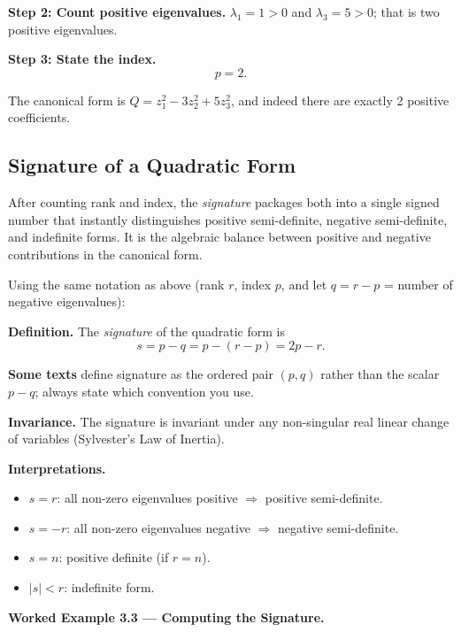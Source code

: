 \documentclass[12pt,a4paper]{article}
\begin{document}
\textbf{Step 2: Count positive eigenvalues.}
\(\lambda_1 = 1 > 0\) and \(\lambda_3 = 5 > 0\); that is two positive eigenvalues.

\textbf{Step 3: State the index.}
\[
  p = 2.
\]

The canonical form is \(Q = z_1^2 - 3z_2^2 + 5z_3^2\), and indeed there are exactly
2 positive coefficients.

\subsection{Signature of a Quadratic Form}

After counting rank and index, the \emph{signature} packages both into a single signed
number that instantly distinguishes positive semi-definite, negative semi-definite, and
indefinite forms. It is the algebraic balance between positive and negative contributions
in the canonical form.

\begin{infobox}
Using the same notation as above (rank \(r\), index \(p\), and let
\(q = r - p\) = number of negative eigenvalues):

\medskip
\textbf{Definition.} The \emph{signature} of the quadratic form is
\[
  s = p - q = p - (r - p) = 2p - r.
\]

\medskip
\textbf{Some texts} define signature as the ordered pair \((p, q)\) rather than the
scalar \(p - q\); always state which convention you use.

\medskip
\textbf{Invariance.} The signature is invariant under any non-singular real linear
change of variables (Sylvester's Law of Inertia).

\medskip
\textbf{Interpretations.}
\begin{itemize}[noitemsep]
  \item \(s = r\): all non-zero eigenvalues positive \(\Rightarrow\) positive semi-definite.
  \item \(s = -r\): all non-zero eigenvalues negative \(\Rightarrow\) negative semi-definite.
  \item \(s = n\): positive definite (if \(r = n\)).
  \item \(|s| < r\): indefinite form.
\end{itemize}
\end{infobox}

\medskip
\noindent\textbf{Worked Example 3.3 --- Computing the Signature.}
\end{document}
